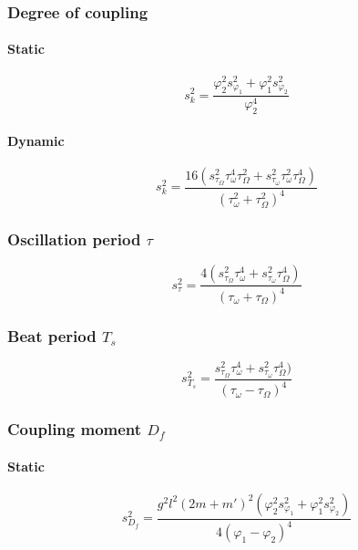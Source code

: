 \documentclass{scrreprt}
\renewcommand{\phi}{\varphi}
\begin{document}
\subsubsection{Degree of coupling}
\paragraph*{Static}
\begin{equation}
s_k^2 = \frac{\phi_2^2 s_{\phi_1}^2 + \phi_1^2 s_{\phi_2}^2}{\phi_2^4}
\end{equation}

\paragraph*{Dynamic}
\begin{equation}
s_k^2 = \frac{16 \left( s_{\tau_{\Omega}}^2 \tau_{\omega}^4 \tau_{\Omega}^2 + s_{\tau_{\omega}}^2 \tau_{\omega}^2 \tau_{\Omega}^4 \right)}{\left( \tau_{\omega}^2+ \tau_{\Omega}^2 \right)^4}
\end{equation}

\subsubsection{Oscillation period $\tau$}
\begin{equation}
s_{\tau}^2 = \frac{4 \left( s_{\tau_{\Omega}}^2 \tau_{\omega}^4 + s_{\tau_{\omega}}^2 \tau_{\Omega}^4 \right)}{\left( \tau_{\omega}+ \tau_{\Omega} \right)^4}
\end{equation}

\subsubsection{Beat period $T_s$}
\begin{equation}
s_{T_s}^2 = \frac{s_{\tau_{\Omega}}^2 \tau_{\omega}^4 + s_{\tau_{\omega}}^2 \tau_{\Omega}^4 )}{\left( \tau_{\omega} - \tau_{\Omega} \right)^4}
\end{equation}

\subsubsection{Coupling moment $D_f$}

\paragraph*{Static}
\begin{equation}
s_{D_f}^2 = \frac{g^2 l^2 \left(2 m + m'\right)^2 \left( \phi_2^2 s_{\phi_1}^2 + \phi_1^2 s_{\phi_2}^2 \right)}{4 \left(\phi_1 -\phi_2\right)^4} 
\end{equation}
\end{document}
